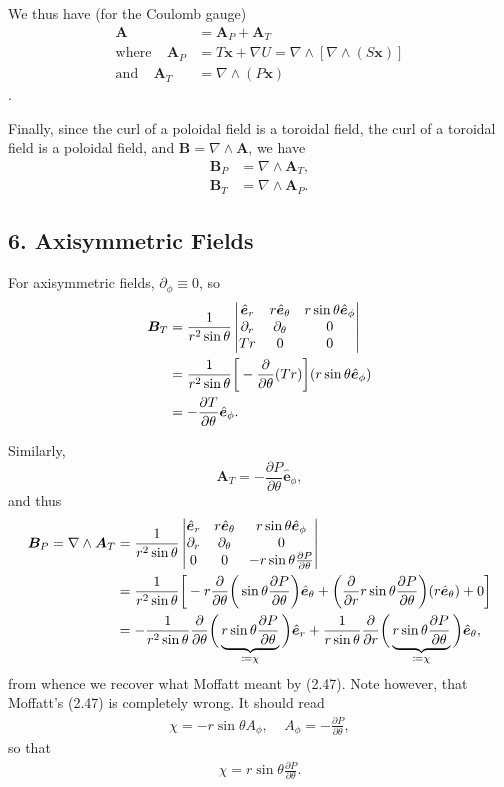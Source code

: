 \documentclass[12pt]{article} %
\newcommand{\pderiv}[2]{\frac{\partial#1}{\partial#2}}
\newcommand{\andd}{\text{and}\ \ \ \ \ }
\newcommand{\five}{\ \ \ \ \ }
\newcommand{\e}{\hat{\bm{e}}}
\begin{document}
We thus have (for the Coulomb gauge)
\begin{align*}
\bm{A} &= \bm{A}_P + \bm{A}_T\\
\text{where}\five \bm{A}_P &= T\bm{x} + \nabla U = \nabla\wedge[\nabla\wedge(S\bm{x})]\\
\andd \bm{A}_T &= \nabla\wedge(P\bm{x})
\end{align*}. 

Finally, since the curl of a poloidal field is a toroidal field, the curl of a toroidal field is a poloidal field, and $\bm{B} = \nabla\wedge \bm{A}$, we have
\begin{align*}
\bm{B}_P &= \nabla\wedge\bm{A}_T,\\
\bm{B}_T &= \nabla\wedge\bm{A}_P.
\end{align*}

\subsection*{6. Axisymmetric Fields}
For axisymmetric fields, $\partial_\phi\equiv0$, so
\begin{align*}
\bm{B}_T &= \frac{1}{r^2\sin\theta}
 \begin{vmatrix} \e_r & r\e_\theta & r\sin\theta\e_\phi\\
\partial_r & \partial_\theta & 0\\
Tr & 0 & 0
\end{vmatrix}\\
&=  \frac{1}{r^2\sin\theta}\bigg{[}-\pderiv{}{\theta}(Tr)\bigg{]}(r\sin\theta\e_\phi)\\
&= -\pderiv{T}{\theta}\e_\phi.
\end{align*}

Similarly, $$\bm{A}_T = -\pderiv{P}{\theta}\e_\phi,$$ and thus
\begin{align*}
\bm{B}_P = \nabla\wedge\bm{A}_T &= \frac{1}{r^2\sin\theta}\begin{vmatrix} \e_r & r\e_\theta & r\sin\theta\e_\phi\\
\partial_r & \partial_\theta & 0\\
0 & 0 & -r\sin\theta\pderiv{P}{\theta}
\end{vmatrix}\\
&= \frac{1}{r^2\sin\theta}\bigg{[}-r\pderiv{}{\theta}\bigg{(}\sin\theta\pderiv{P}{\theta}\bigg{)}\e_\theta + \bigg{(}\pderiv{}{r}r\sin\theta\pderiv{P}{\theta}\bigg{)}(r\e_\theta) + 0\bigg{]}\\
&= -\frac{1}{r^2\sin\theta}\pderiv{}{\theta}\bigg{(}\underbrace{r\sin\theta\pderiv{P}{\theta}}_{\coloneqq\chi}\bigg{)}\e_r +
 \frac{1}{r\sin\theta}\pderiv{}{r}\bigg{(}\underbrace{r\sin\theta\pderiv{P}{\theta}}_{\coloneqq\chi}\bigg{)}\e_\theta,
\end{align*}
from whence we recover what Moffatt meant by (2.47). Note however, that Moffatt's (2.47) is completely wrong. It should read
\begin{align*}
\chi = -r\sin\theta A_\phi, \five A_\phi = -\pderiv{P}{\theta},
\end{align*}
so that
\begin{align*}
\chi = r\sin\theta\pderiv{P}{\theta}.
\end{align*}
\end{document}
